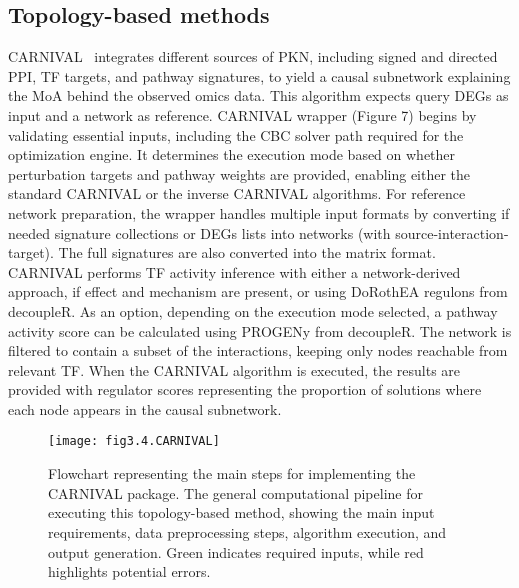 \subsection{Topology-based methods} %
\label{sub:topologybasedmethods}

\gls{CARNIVAL}~\cite{RN41} integrates different sources of \gls{PKN}, including signed and directed \gls{PPI}, \gls{TF} targets, and pathway signatures, to yield a causal subnetwork explaining the MoA behind the observed omics data. This algorithm expects query \gls{DEGs} as input and a network as reference. \gls{CARNIVAL} wrapper (Figure 7) begins by validating essential inputs, including the CBC solver path required for the optimization engine. 
It determines the execution mode based on whether perturbation targets and pathway weights are provided, enabling either the standard \gls{CARNIVAL} or the inverse \gls{CARNIVAL} algorithms. 
For reference network preparation, the wrapper handles multiple input formats by converting if needed signature collections or \gls{DEGs} lists into networks (with source-interaction-target). The full signatures are also converted into the matrix format. \gls{CARNIVAL} performs \gls{TF} activity inference with either a network-derived approach, if effect and mechanism are present, or using DoRothEA regulons from decoupleR. 
As an option, depending on the execution mode selected, a pathway activity score can be calculated using PROGENy from decoupleR. 
The network is filtered to contain a subset of the interactions, keeping only nodes reachable from relevant \gls{TF}. When the \gls{CARNIVAL} algorithm is executed, the results are provided with regulator scores representing the proportion of solutions where each node appears in the causal subnetwork.


\begin{figure}[htbp]
    \centering
    \texttt{[image: fig3.4.CARNIVAL]}
    \caption[Flowchart representing the main steps for implementing the CARNIVAL package.]{Flowchart representing the main steps for implementing the \gls{CARNIVAL} package. The general computational pipeline for executing this topology-based method, showing the main input requirements, data preprocessing steps, algorithm execution, and output generation. Green indicates required inputs, while red highlights potential errors.}
    \label{fig:fig3.4.CARNIVAL}
\end{figure}

